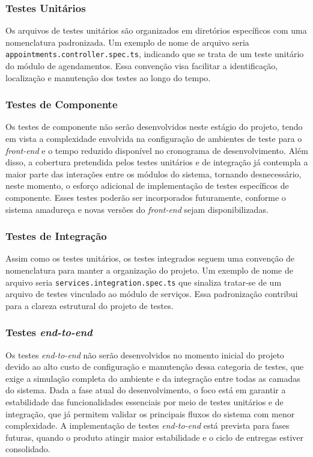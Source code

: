 \subsubsection{Testes Unitários}
Os arquivos de testes unitários são organizados em diretórios específicos com uma nomenclatura padronizada. Um exemplo de nome de arquivo seria \texttt{appointments.\allowbreak controller.\allowbreak spec.ts}, indicando que se trata de um teste unitário do módulo de agendamentos. Essa convenção visa facilitar a identificação, localização e manutenção dos testes ao longo do tempo.

\subsubsection{Testes de Componente}
Os testes de componente não serão desenvolvidos neste estágio do projeto, 
tendo em vista a complexidade envolvida na configuração de ambientes de teste para o \textit{front-end} e o tempo reduzido disponível no cronograma de desenvolvimento.
Além disso, a cobertura pretendida pelos testes unitários e de integração já contempla a maior parte das interações entre os módulos do sistema, 
tornando desnecessário, neste momento, o esforço adicional de implementação de testes específicos de componente. 
Esses testes poderão ser incorporados futuramente, conforme o sistema amadureça e novas versões do \textit{front-end} sejam disponibilizadas.

\subsubsection{Testes de Integração}
Assim como os testes unitários, os testes integrados seguem uma convenção de nomenclatura para manter a organização do projeto. Um exemplo de nome de arquivo seria \texttt{services.\allowbreak integration.\allowbreak spec.ts} que sinaliza tratar-se de um arquivo de testes vinculado ao módulo de serviços. Essa padronização contribui para a clareza estrutural do projeto de testes.


\subsubsection{Testes \textit{end-to-end}}
Os testes \textit{end-to-end} não serão desenvolvidos no momento inicial do projeto devido ao alto custo de configuração e manutenção dessa categoria de testes, 
que exige a simulação completa do ambiente e da integração entre todas as camadas do sistema. 
Dada a fase atual do desenvolvimento, o foco está em garantir a estabilidade das funcionalidades essenciais por meio de testes unitários e de integração, 
que já permitem validar os principais fluxos do sistema com menor complexidade. 
A implementação de testes \textit{end-to-end} está prevista para fases futuras, quando o produto atingir maior estabilidade e o ciclo de entregas estiver consolidado.


